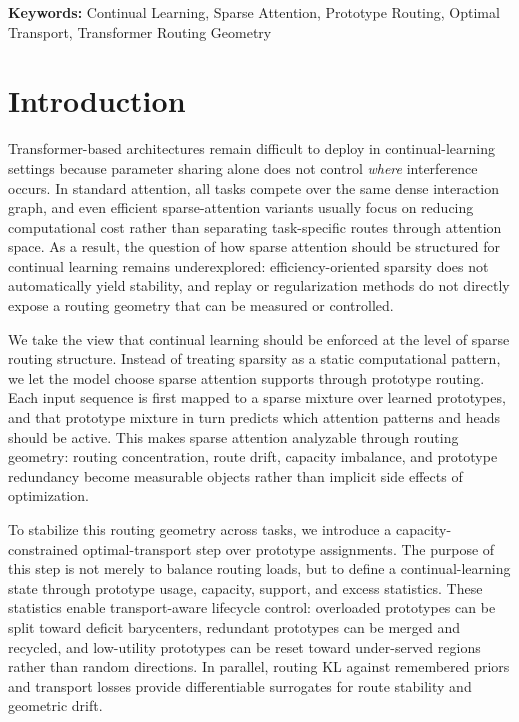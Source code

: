 \documentclass[11pt,a4paper]{article}
\theoremstyle{definition}
\begin{document}
\textbf{Keywords:} Continual Learning, Sparse Attention, Prototype Routing, Optimal Transport, Transformer Routing Geometry

\section{Introduction}
\label{sec:introduction}

Transformer-based architectures remain difficult to deploy in continual-learning settings because parameter sharing alone does not control \textit{where} interference occurs. In standard attention, all tasks compete over the same dense interaction graph, and even efficient sparse-attention variants usually focus on reducing computational cost rather than separating task-specific routes through attention space. As a result, the question of how sparse attention should be structured for continual learning remains underexplored: efficiency-oriented sparsity does not automatically yield stability, and replay or regularization methods do not directly expose a routing geometry that can be measured or controlled.

We take the view that continual learning should be enforced at the level of sparse routing structure. Instead of treating sparsity as a static computational pattern, we let the model choose sparse attention supports through prototype routing. Each input sequence is first mapped to a sparse mixture over learned prototypes, and that prototype mixture in turn predicts which attention patterns and heads should be active. This makes sparse attention analyzable through routing geometry: routing concentration, route drift, capacity imbalance, and prototype redundancy become measurable objects rather than implicit side effects of optimization.

To stabilize this routing geometry across tasks, we introduce a capacity-constrained optimal-transport step over prototype assignments. The purpose of this step is not merely to balance routing loads, but to define a continual-learning state through prototype usage, capacity, support, and excess statistics. These statistics enable transport-aware lifecycle control: overloaded prototypes can be split toward deficit barycenters, redundant prototypes can be merged and recycled, and low-utility prototypes can be reset toward under-served regions rather than random directions. In parallel, routing KL against remembered priors and transport losses provide differentiable surrogates for route stability and geometric drift.
\end{document}
